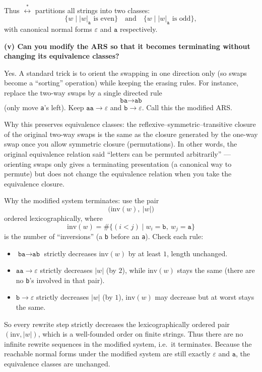 \documentclass[12pt]{article}
\begin{document}
Thus \(\stackrel{*}{\longleftrightarrow}\) partitions all strings into two classes:
\[
\{w\mid |w|_{\texttt{a}}\text{ is even}\}\quad\text{and}\quad\{w\mid |w|_{\texttt{a}}\text{ is odd}\},
\]
with canonical normal forms \(\varepsilon\) and \(\texttt{a}\) respectively.

\bigskip

\textbf{(v) Can you modify the ARS so that it becomes terminating without changing its equivalence classes?}

Yes. A standard trick is to orient the swapping in one direction only (so swaps become a ``sorting'' operation) while keeping the erasing rules. For instance, replace the two-way swaps by a single directed rule
\[
\texttt{ba}\longrightarrow\texttt{ab}
\]
(only move \texttt{a}'s left). Keep \(\texttt{aa}\to\varepsilon\) and \(\texttt{b}\to\varepsilon\). Call this the modified ARS.

Why this preserves equivalence classes: the reflexive–symmetric–transitive closure of the original two-way swaps is the same as the closure generated by the one-way swap once you allow symmetric closure (permutations). In other words, the original equivalence relation said “letters can be permuted arbitrarily” — orienting swaps only gives a terminating presentation (a canonical way to permute) but does not change the equivalence relation when you take the equivalence closure.

Why the modified system terminates: use the pair
\[
\big(\mathrm{inv}(w),\ |w|\big)
\]
ordered lexicographically, where
\[
\mathrm{inv}(w)=\#\{(i<j)\mid w_i=\texttt{b},\ w_j=\texttt{a}\}
\]
is the number of ``inversions'' (a \texttt{b} before an \texttt{a}). Check each rule:

\begin{itemize}
  \item \(\texttt{ba}\to\texttt{ab}\) strictly decreases \(\mathrm{inv}(w)\) by at least \(1\), length unchanged.
  \item \(\texttt{aa}\to\varepsilon\) strictly decreases \(|w|\) (by \(2\)), while \(\mathrm{inv}(w)\) stays the same (there are no \texttt{b}'s involved in that pair).
  \item \(\texttt{b}\to\varepsilon\) strictly decreases \(|w|\) (by \(1\)), \(\mathrm{inv}(w)\) may decrease but at worst stays the same.
\end{itemize}

So every rewrite step strictly decreases the lexicographically ordered pair \((\mathrm{inv},|w|)\), which is a well-founded order on finite strings. Thus there are no infinite rewrite sequences in the modified system, i.e.\ it terminates. Because the reachable normal forms under the modified system are still exactly \(\varepsilon\) and \(\texttt{a}\), the equivalence classes are unchanged.
\end{document}

